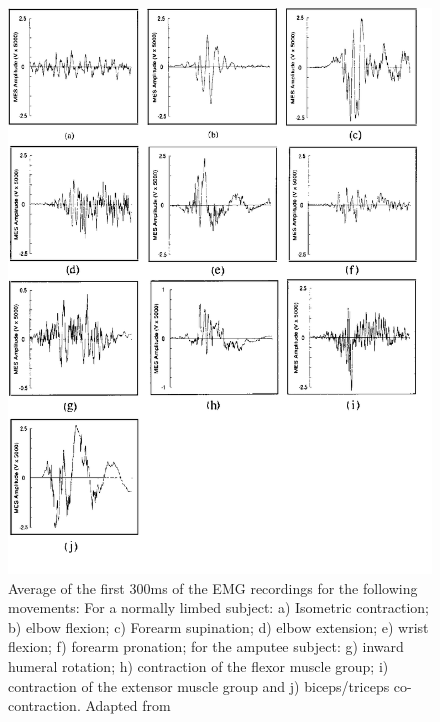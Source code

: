          \begin{figure}[thpb]
      \centering
      \includegraphics[width = \textwidth]{Images/EMG_patterns.jpg}
      \caption{Average of the first 300ms of the EMG recordings for the following movements: For a normally limbed subject: a) Isometric contraction; b) elbow flexion; c) Forearm supination; d) elbow extension; e) wrist flexion; f) forearm pronation; for the amputee subject: g) inward humeral rotation; h) contraction of the flexor muscle group; i) contraction of the extensor muscle group and j) biceps/triceps co-contraction. Adapted from \cite{Hudgins204774}}
      \label{EMG patterns}
   \end{figure}
   
